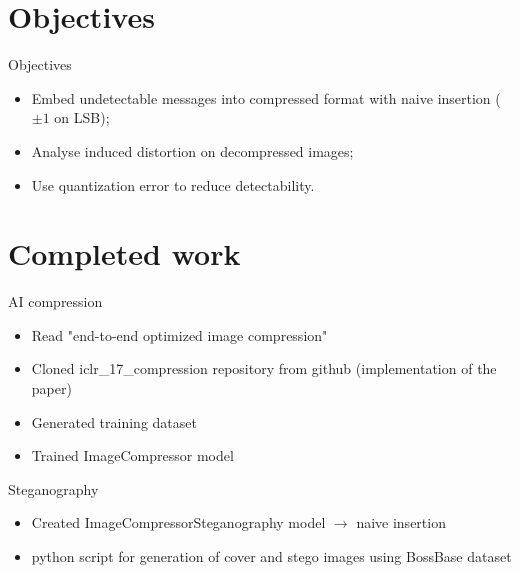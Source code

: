 \documentclass[11pt,compress]{beamer} %
\begin{document}
\section{Objectives}
\begin{frame}{Objectives}
  \begin{itemize}
    \item Embed undetectable messages into compressed format with naive insertion ($\pm1$ on LSB);
    \item Analyse induced distortion on decompressed images;
    \item Use quantization error to reduce detectability.
  \end{itemize}
\end{frame}


\section{Completed work}
\begin{frame}{AI compression}
  \begin{itemize}
    \item Read "\lowercase{END-TO-END OPTIMIZED IMAGE COMPRESSION}"
    \item Cloned iclr\_17\_compression repository from github (implementation of the paper)
    \item Generated training dataset
    \item Trained ImageCompressor model
  \end{itemize}
\end{frame}

\begin{frame}{Steganography}
  \begin{itemize}
    \item Created ImageCompressorSteganography model $\rightarrow$ naive insertion
    \item python script for generation of cover and stego images using BossBase dataset
  \end{itemize}
\end{frame}
\end{document}
